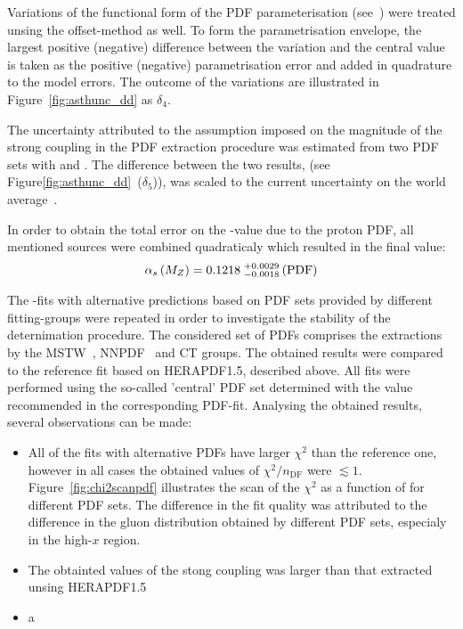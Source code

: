 Variations of the functional form of the PDF parameterisation (see~\cite{herapdf1.5}) were treated unsing the offset-method as well. To form the parametrisation envelope, the largest positive (negative) difference between the variation and the central value is taken as the positive (negative) parametrisation error and added in quadrature to the model errors. The outcome of the variations are illustrated in Figure~\ref{fig:asthunc_dd} as $\delta_4$.

The uncertainty attributed to the assumption imposed on the magnitude of the strong coupling in the PDF extraction procedure was estimated from two PDF sets with  and . The difference between the two results, (see Figure\ref{fig:asthunc_dd}~($\delta_5$)), was scaled to the current uncertainty on the world average~\cite{Bethke:2012jm}.

In order to obtain the total error on the \asz-value due to the proton PDF, all mentioned sources were combined quadraticaly which resulted in the final value:
\begin{equation}
 \mbox{$\alpha_{s}\left(M_{Z}\right)$} = 0.1218\;^{+0.0029}_{-0.0018}\left(\text{PDF}\right)
\end{equation}

The \asz-fits with alternative predictions based on PDF sets provided by different fitting-groups were repeated in order to investigate the stability of the \asz deternimation procedure. The considered set of PDFs comprises the extractions by the MSTW~\cite{}, NNPDF~\cite{} and CT groups. The obtained results were compared to the reference fit based on HERAPDF1.5, described above. All fits were performed using the so-called 'central' PDF set determined with the \asz value recommended in the corresponding PDF-fit. Analysing the obtained results, several observations can be made:
\begin{itemize}
 \item All of the fits with alternative PDFs have larger $\chi^2$ than the reference one, however in all cases the obtained values of $\chi^2/n_\text{DF}$ were $\lesssim 1$. Figure~\ref{fig:chi2scanpdf} illustrates the scan of the $\chi^2$ as a function of \asz for different PDF sets. The difference in the fit quality was attributed to the difference in the gluon distribution obtained by different PDF sets, especialy in the high-$x$ region.
 \item The obtainted values of the stong coupling was larger than that extracted unsing HERAPDF1.5
 \item a
\end{itemize}


